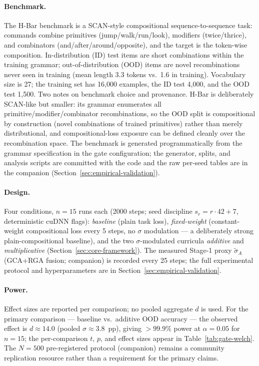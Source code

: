 \documentclass{article}
\theoremstyle{definition}
\begin{document}
\paragraph*{Benchmark.}
The H-Bar benchmark is a SCAN-style compositional sequence-to-sequence
task: commands combine primitives (jump/walk/run/look), modifiers
(twice/thrice), and combinators (and/after/around/opposite), and the
target is the token-wise composition. In-distribution (ID) test items
are short combinations within the training grammar; out-of-distribution
(OOD) items are novel recombinations never seen in training (mean
length 3.3 tokens vs.\ 1.6 in training). Vocabulary size is 27; the
training set has 16{,}000 examples, the ID test 4{,}000, and the OOD
test 1{,}500. Two notes on benchmark choice and provenance. H-Bar is
deliberately SCAN-like but smaller: its grammar enumerates all
primitive/modifier/combinator recombinations, so the OOD split is
compositional by construction (novel combinations of trained primitives)
rather than merely distributional, and compositional-loss exposure can
be defined cleanly over the recombination space. The benchmark is
generated programmatically from the grammar specification in the gate
configuration; the generator, splits, and analysis scripts are committed
with the code and the raw per-seed tables are in the companion
(Section~\ref{sec:empirical-validation}).

\paragraph*{Design.}
Four conditions, $n = 15$ runs each (2000 steps; seed discipline
$s_r = r \cdot 42 + 7$, deterministic cuDNN flags): \emph{baseline}
(plain task loss), \emph{fixed-weight} (constant-weight compositional
loss every 5 steps, no $\sigma$ modulation --- a deliberately strong
plain-compositional baseline), and the two $\sigma$-modulated curricula
\emph{additive} and \emph{multiplicative}
(Section~\ref{sec:core-framework}). The measured Stage-1 proxy
$\tilde{\sigma}_A$ (GCA+RGA fusion; companion) is recorded every 25
steps; the full experimental protocol and hyperparameters are in
Section~\ref{sec:empirical-validation}.

\paragraph*{Power.}
Effect sizes are reported per comparison; no pooled aggregate
$d$ is used. For the primary comparison --- baseline vs.\ additive OOD
accuracy --- the observed effect is $d \approx 14.0$
(pooled $\sigma \approx 3.8$~pp), giving $> 99.9\%$ power at
$\alpha = 0.05$ for $n = 15$; the per-comparison $t$, $p$, and effect
sizes appear in Table~\ref{tab:gate-welch}. The $N = 500$
pre-registered protocol (companion) remains a community replication
resource rather than a requirement for the primary claims.
\end{document}
